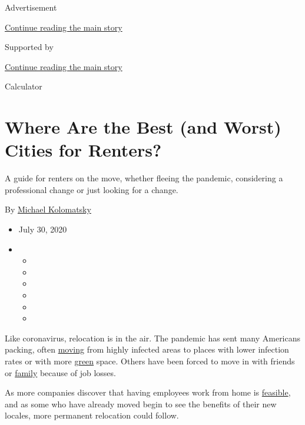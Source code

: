Advertisement

\protect\hyperlink{after-top}{Continue reading the main story}

Supported by

\protect\hyperlink{after-sponsor}{Continue reading the main story}

Calculator

\hypertarget{where-are-the-best-and-worst-cities-for-renters}{%
\section{Where Are the Best (and Worst) Cities for
Renters?}\label{where-are-the-best-and-worst-cities-for-renters}}

A guide for renters on the move, whether fleeing the pandemic,
considering a professional change or just looking for a change.

By \href{https://www.nytimes.com/by/michael-kolomatsky}{Michael
Kolomatsky}

\begin{itemize}
\item
  July 30, 2020
\item
  \begin{itemize}
  \item
  \item
  \item
  \item
  \item
  \item
  \end{itemize}
\end{itemize}

Like coronavirus, relocation is in the air. The pandemic has sent many
Americans packing, often
\href{https://www.nytimes.com/2020/07/28/realestate/buying-selling-moving-during-coronavirus.html}{moving}
from highly infected areas to places with lower infection rates or with
more
\href{https://www.nytimes.com/2018/12/14/realestate/forget-the-suburbs-its-country-or-bust.html}{green}
space. Others have been forced to move in with friends or
\href{https://www.nytimes.com/2020/06/25/realestate/more-adults-than-ever-live-with-parents-or-grandparents.html}{family}
because of job losses.

As more companies discover that having employees work from home is
\href{https://www.nytimes.com/2020/07/02/upshot/is-the-five-day-office-week-over.html}{feasible},
and as some who have already moved begin to see the benefits of their
new locales, more permanent relocation could follow.


